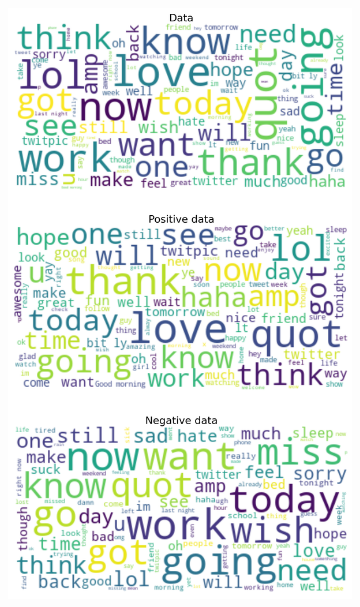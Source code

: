 \documentclass{article}
\begin{document}
\begin{itemize}
\begin{figure}[H]
\centering
\captionsetup{justification=centering}
\begin{subfigure}[b]{0.24\textwidth}
\centering
\includegraphics[width=\textwidth]{chapter-06/section-01-01/03/visualization/1/wordcloud.png}
\end{subfigure}
\begin{subfigure}[b]{0.24\textwidth}
\centering

\end{subfigure}
\end{figure}
\end{itemize}
\end{document}

